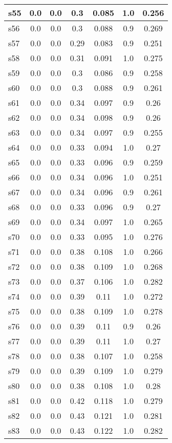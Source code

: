 \documentclass{article}
\begin{document}
\begin{tabular}{|l|c|c|c|c|c|c|}
s55 &0.0 & 0.0 & 0.3 & 0.085 & 1.0 & 0.256\\
\hline
s56 &0.0 & 0.0 & 0.3 & 0.088 & 0.9 & 0.269\\
\hline
s57 &0.0 & 0.0 & 0.29 & 0.083 & 0.9 & 0.251\\
\hline
s58 &0.0 & 0.0 & 0.31 & 0.091 & 1.0 & 0.275\\
\hline
s59 &0.0 & 0.0 & 0.3 & 0.086 & 0.9 & 0.258\\
\hline
s60 &0.0 & 0.0 & 0.3 & 0.088 & 0.9 & 0.261\\
\hline
s61 &0.0 & 0.0 & 0.34 & 0.097 & 0.9 & 0.26\\
\hline
s62 &0.0 & 0.0 & 0.34 & 0.098 & 0.9 & 0.26\\
\hline
s63 &0.0 & 0.0 & 0.34 & 0.097 & 0.9 & 0.255\\
\hline
s64 &0.0 & 0.0 & 0.33 & 0.094 & 1.0 & 0.27\\
\hline
s65 &0.0 & 0.0 & 0.33 & 0.096 & 0.9 & 0.259\\
\hline
s66 &0.0 & 0.0 & 0.34 & 0.096 & 1.0 & 0.251\\
\hline
s67 &0.0 & 0.0 & 0.34 & 0.096 & 0.9 & 0.261\\
\hline
s68 &0.0 & 0.0 & 0.33 & 0.096 & 0.9 & 0.27\\
\hline
s69 &0.0 & 0.0 & 0.34 & 0.097 & 1.0 & 0.265\\
\hline
s70 &0.0 & 0.0 & 0.33 & 0.095 & 1.0 & 0.276\\
\hline
s71 &0.0 & 0.0 & 0.38 & 0.108 & 1.0 & 0.266\\
\hline
s72 &0.0 & 0.0 & 0.38 & 0.109 & 1.0 & 0.268\\
\hline
s73 &0.0 & 0.0 & 0.37 & 0.106 & 1.0 & 0.282\\
\hline
s74 &0.0 & 0.0 & 0.39 & 0.11 & 1.0 & 0.272\\
\hline
s75 &0.0 & 0.0 & 0.38 & 0.109 & 1.0 & 0.278\\
\hline
s76 &0.0 & 0.0 & 0.39 & 0.11 & 0.9 & 0.26\\
\hline
s77 &0.0 & 0.0 & 0.39 & 0.11 & 1.0 & 0.27\\
\hline
s78 &0.0 & 0.0 & 0.38 & 0.107 & 1.0 & 0.258\\
\hline
s79 &0.0 & 0.0 & 0.39 & 0.109 & 1.0 & 0.279\\
\hline
s80 &0.0 & 0.0 & 0.38 & 0.108 & 1.0 & 0.28\\
\hline
s81 &0.0 & 0.0 & 0.42 & 0.118 & 1.0 & 0.279\\
\hline
s82 &0.0 & 0.0 & 0.43 & 0.121 & 1.0 & 0.281\\
\hline
s83 &0.0 & 0.0 & 0.43 & 0.122 & 1.0 & 0.282\\

\end{tabular}
\end{document}
